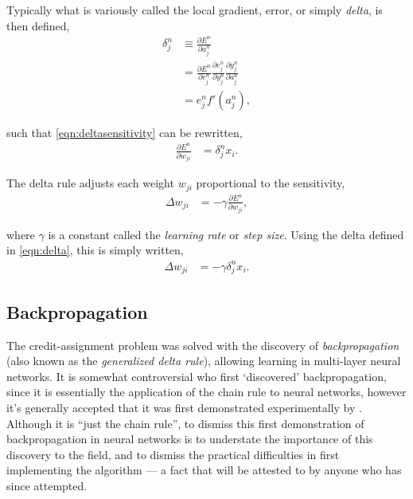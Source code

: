 \documentclass[thesis]{subfiles}
\begin{document}
Typically what is variously called the local gradient, error, or simply \emph{delta}, is then defined,
\begin{equation}
\label{eqn:delta}
\begin{aligned}
    \delta^n_j &\equiv \frac{\partial E^n}{\partial a^n_j}\\
    &= \frac{\partial E^n}{\partial e^n_j}\frac{\partial e^n_j}{\partial y^n_j} \frac{\partial y^n_j}{\partial a^n_j}\\
    &= e^n_j  f'\left( a^n_j \right),
\end{aligned}
\end{equation}

such that \cref{eqn:deltasensitivity} can be rewritten,
\begin{equation}
\begin{aligned}
    \frac{\partial E^n}{\partial w_{ji}} &= \delta^n_j x_i.
\end{aligned}
\end{equation}


The delta rule adjusts each weight $w_{ji}$ proportional to the sensitivity, 
\begin{equation}
\begin{aligned}
    \Delta w_{ji} &= -\gamma \frac{\partial E^n}{\partial w_{ji}},
\end{aligned}
\end{equation}

where $\gamma$ is a constant called the \emph{learning rate} or \emph{step size}. Using the delta defined in \cref{eqn:delta}, this is simply written,
\begin{equation}
\begin{aligned}
    \Delta w_{ji} &= -\gamma \delta^n_j x_i.
\end{aligned}
\end{equation}


\subsection{Backpropagation}
The credit-assignment problem was solved with the discovery of \emph{backpropagation} (also known as the \emph{generalized delta rule}), allowing learning in multi-layer neural networks. It is somewhat controversial who first `discovered' backpropagation, since it is essentially the application of the chain rule to neural networks, however it's generally accepted that it was first demonstrated experimentally by \citet{rumelhartbackprop}. Although it is ``just the chain rule'', to dismiss this first demonstration of backpropagation in neural networks is to understate the importance of this discovery to the field, and to dismiss the practical difficulties in first implementing the algorithm --- a fact that will be attested to by anyone who has since attempted.
\end{document}

